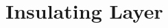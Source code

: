 \documentclass[../../main]{subfiles}
\begin{document}
\section{Insulating Layer} \label{sec:}
\end{document}
